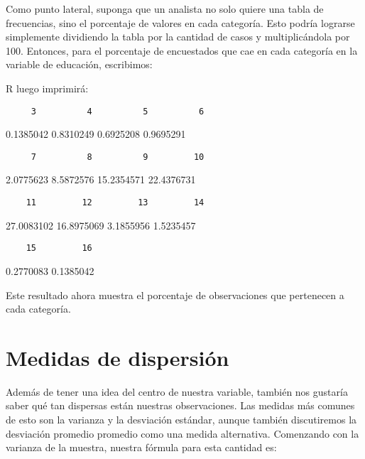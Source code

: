 \documentclass[
]{book}
\newenvironment{Shaded}{\begin{snugshade}}{\end{snugshade}}
\newcommand{\DecValTok}[1]{\textcolor[rgb]{0.00,0.00,0.81}{#1}}
\newcommand{\FunctionTok}[1]{\textcolor[rgb]{0.00,0.00,0.00}{#1}}
\newcommand{\NormalTok}[1]{#1}
\newcommand{\SpecialCharTok}[1]{\textcolor[rgb]{0.00,0.00,0.00}{#1}}
\begin{document}
Como punto lateral, suponga que un analista no solo quiere una tabla de frecuencias, sino el porcentaje de valores en cada categoría. Esto podría lograrse simplemente dividiendo la tabla por la cantidad de casos y multiplicándola por 100. Entonces, para el porcentaje de encuestados que cae en cada categoría en la variable de educación, escribimos:

\begin{Shaded}
\end{Shaded}

R luego imprimirá:

\begin{verbatim}
     3          4          5          6
\end{verbatim}

0.1385042 0.8310249 0.6925208 0.9695291

\begin{verbatim}
     7          8          9         10
\end{verbatim}

2.0775623 8.5872576 15.2354571 22.4376731

\begin{verbatim}
    11         12         13         14
\end{verbatim}

27.0083102 16.8975069 3.1855956 1.5235457

\begin{verbatim}
    15         16
\end{verbatim}

0.2770083 0.1385042

Este resultado ahora muestra el porcentaje de observaciones que pertenecen a cada categoría.

\hypertarget{medidas-de-dispersiuxf3n}{%
\section*{Medidas de dispersión}\label{medidas-de-dispersiuxf3n}}

Además de tener una idea del centro de nuestra variable, también nos gustaría saber qué tan dispersas están nuestras observaciones. Las medidas más comunes de esto son la varianza y la desviación estándar, aunque también discutiremos la desviación promedio promedio como una medida alternativa. Comenzando con la varianza de la muestra, nuestra fórmula para esta cantidad es:
\end{document}
